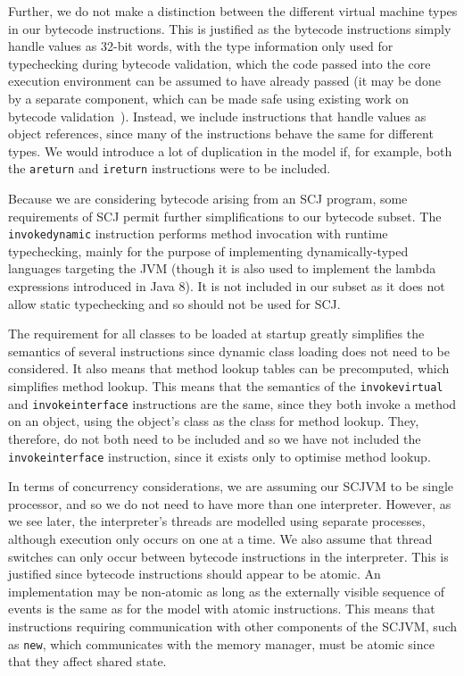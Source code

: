 Further, we do not make a distinction between the different virtual
machine types in our bytecode instructions.
This is justified as the bytecode instructions simply handle values as
32-bit words, with the type information only used for typechecking
during bytecode validation, which the code passed into the core
execution environment can be assumed to have already passed (it may be
done by a separate component, which can be made safe using existing
work on bytecode validation~\cite{klein2003, stark2001, coglio2000,
  xavier2003}). 
Instead, we include instructions that handle values as object
references, since many of the instructions behave the same for
different types.
We would introduce a lot of duplication in the model if, for example,
both the \texttt{areturn} and \texttt{ireturn} instructions were to be
included.

Because we are considering bytecode arising from an SCJ program, some
requirements of SCJ permit further simplifications to our bytecode
subset.
The \texttt{invokedynamic} instruction performs method invocation with
runtime typechecking, mainly for the purpose of implementing
dynamically-typed languages targeting the JVM (though it is also used
to implement the lambda expressions introduced in Java 8).
It is not included in our subset as it does not allow static
typechecking and so should not be used for SCJ.

The requirement for all classes to be loaded at startup greatly
simplifies the semantics of several instructions since dynamic class
loading does not need to be considered.
It also means that method lookup tables can be precomputed, which
simplifies method lookup.
This means that the semantics of the \texttt{invokevirtual} and
\texttt{invokeinterface} instructions are the same, since they both
invoke a method on an object, using the object's class as the class
for method lookup.
They, therefore, do not both need to be included and so we have not
included the \texttt{invokeinterface} instruction, since it exists
only to optimise method lookup.

In terms of concurrency considerations, we are assuming our SCJVM to
be single processor, and so we do not need to have more than one
interpreter.
However, as we see later, the interpreter's threads are modelled using
separate \Circus{} processes, although execution only occurs on one at
a time.
We also assume that thread switches can only occur between bytecode
instructions in the interpreter.
This is justified since bytecode instructions should appear to be
atomic.
An implementation may be non-atomic as long as the externally visible
sequence of events is the same as for the model with atomic
instructions.
This means that instructions requiring communication with other
components of the SCJVM, such as \texttt{new}, which communicates with
the memory manager, must be atomic since that they affect shared
state.

